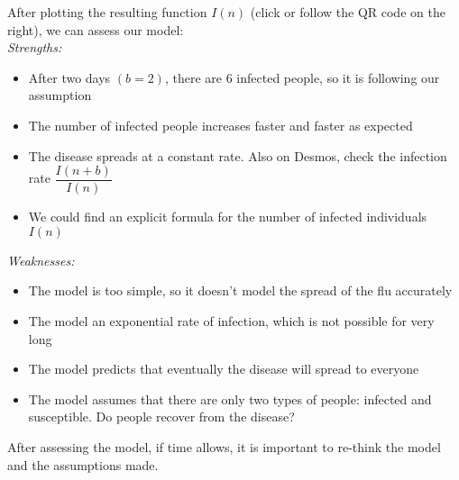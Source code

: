 \begin{siam}
\begin{example}
After plotting the resulting function $I(n)$ (click or follow the QR code on the right), we can assess our model: \\

\emph{Strengths:}
\begin{itemize}
	\item After two days $(b=2)$, there are 6 infected people, so it is following our assumption
	\item The number of infected people increases faster and faster as expected 
	\item The disease spreads at a constant rate. Also on Desmos, check the infection rate $\dfrac{I(n+b)}{I(n)}$
	\item We could find an explicit formula for the number of infected individuals $I(n)$ \\
\end{itemize}


\emph{Weaknesses:}
\begin{itemize}
	\item The model is too simple, so it doesn't model the spread of the flu accurately
	\item The model an exponential rate of infection, which is not possible for very long
	\item The model predicts that eventually the disease will spread to everyone
	\item The model assumes that there are only two types of people: infected and susceptible. Do people recover from the disease?
\end{itemize}

\end{example}




After assessing the model, if time allows, it is important to re-think the model and the assumptions made.

\end{siam}

